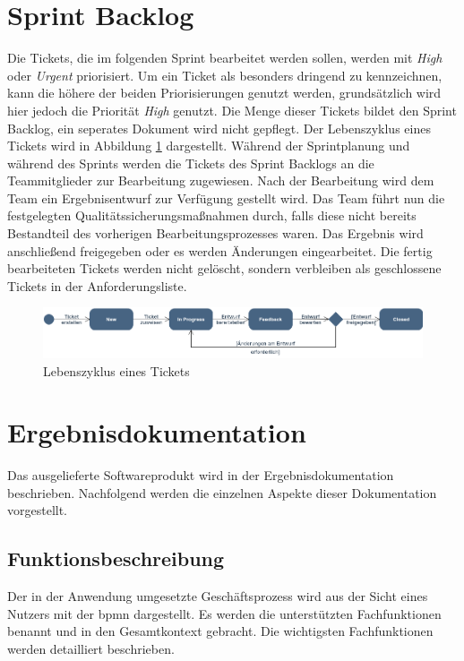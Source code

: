 \documentclass[a4paper,11pt,listof=numbered,glossary=totoc,parskip=half,toc=bib]{scrreprt}
\begin{document}
	\section{Sprint Backlog}
	Die Tickets, die im folgenden Sprint bearbeitet werden sollen, werden mit \textit{High} oder \textit{Urgent} priorisiert. Um ein Ticket als besonders dringend zu kennzeichnen, kann die höhere der beiden Priorisierungen genutzt werden, grundsätzlich wird hier jedoch die Priorität \textit{High} genutzt. Die Menge dieser Tickets bildet den Sprint Backlog, ein seperates Dokument wird nicht gepflegt. Der Lebenszyklus eines Tickets wird in Abbildung \ref{fig:ticketlebenszyklus} dargestellt. Während der Sprintplanung und während des Sprints werden die Tickets des Sprint Backlogs an die Teammitglieder zur Bearbeitung zugewiesen. Nach der Bearbeitung wird dem Team ein Ergebnisentwurf zur Verfügung gestellt wird. Das Team führt nun die festgelegten Qualitätssicherungsmaßnahmen durch, falls diese nicht bereits Bestandteil des vorherigen Bearbeitungsprozesses waren. Das Ergebnis wird anschließend freigegeben oder es werden Änderungen eingearbeitet. Die fertig bearbeiteten Tickets werden nicht gelöscht, sondern verbleiben als geschlossene Tickets in der Anforderungsliste.
	\begin{figure}
		\includegraphics[width=\textwidth]{Ticketlebenszyklus}
		\caption{Lebenszyklus eines Tickets}
		\label{fig:ticketlebenszyklus}
	\end{figure}
	
	
	\section{Ergebnisdokumentation}
	Das ausgelieferte Softwareprodukt wird in der Ergebnisdokumentation beschrieben. Nachfolgend werden die einzelnen Aspekte dieser Dokumentation vorgestellt.
	
	\subsection{Funktionsbeschreibung}
	Der in der Anwendung umgesetzte Geschäftsprozess wird aus der Sicht eines Nutzers mit der \Gls{bpmn} dargestellt. Es werden die unterstützten Fachfunktionen benannt und in den Gesamtkontext gebracht. Die wichtigsten Fachfunktionen werden detailliert beschrieben.
			
\end{document}
